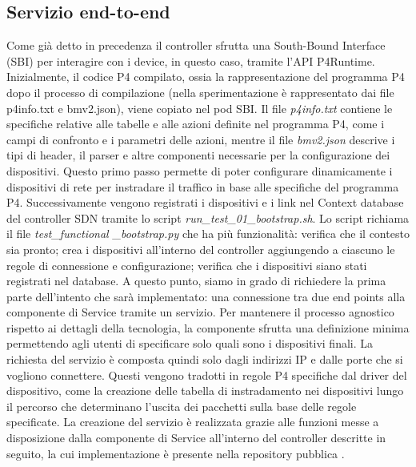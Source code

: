 \subsection{Servizio end-to-end}
\label{cap:service}
Come già detto in precedenza il controller sfrutta una South-Bound Interface (SBI) per interagire con i device, in questo caso, tramite l'API P4Runtime. 
Inizialmente, il codice P4 compilato, ossia la rappresentazione del programma P4 dopo il processo di compilazione (nella sperimentazione è rappresentato dai file p4info.txt e bmv2.json),
viene copiato nel pod SBI.
Il file \textit{p4info.txt} contiene le specifiche relative alle tabelle e alle azioni definite nel programma P4, come i campi di confronto e i parametri delle azioni,
mentre il file \textit{bmv2.json} descrive i tipi di header, il parser e altre componenti necessarie per la configurazione dei dispositivi.
Questo primo passo permette di poter configurare dinamicamente i dispositivi di rete per instradare il traffico in base alle specifiche del programma P4.
\newline Successivamente vengono registrati i dispositivi e i link nel Context database del controller SDN tramite lo script \textit{run\_test\_01\_bootstrap.sh}.
Lo script richiama il file \textit{test\_functional \_bootstrap.py} che ha più funzionalità: verifica che il contesto sia pronto; crea i dispositivi all'interno del controller aggiungendo a ciascuno le regole di connessione e configurazione; verifica che i dispositivi siano stati registrati nel database.
A questo punto, siamo in grado di richiedere la prima parte dell'intento che sarà implementato: una connessione tra due end points alla componente di Service tramite un servizio.
\newline Per mantenere il processo agnostico rispetto ai dettagli della tecnologia, la componente  
sfrutta una definizione minima permettendo agli utenti di specificare solo quali sono i dispositivi finali.
La richiesta del servizio è composta quindi solo dagli indirizzi IP e dalle porte che si vogliono connettere.
Questi vengono tradotti 
in regole P4 specifiche dal driver del dispositivo, come la creazione delle tabella di instradamento nei dispositivi lungo il percorso che determinano l'uscita dei pacchetti sulla 
base delle regole specificate.
\newline La creazione del servizio è realizzata grazie alle funzioni messe a disposizione dalla componente di Service all'interno del controller descritte in seguito, 
la cui implementazione è presente nella repository pubblica \cite{servserv}.

